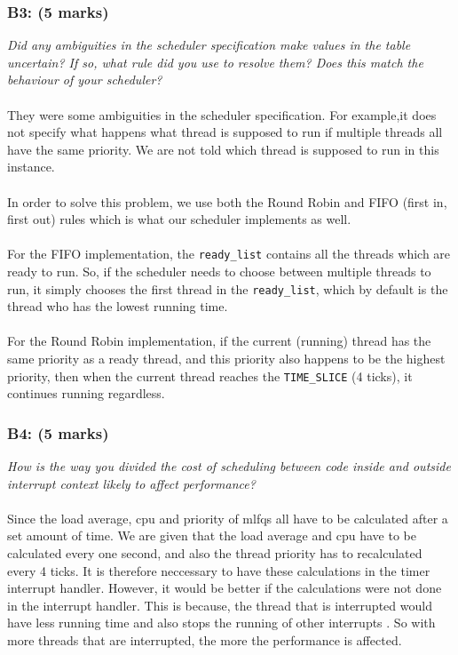 \documentclass{article}
\begin{document}
\subsubsection*{B3: (5 marks) }
\textit{Did any ambiguities in the scheduler specification make values in the table uncertain?  If so, what rule did you use to resolve them?  Does this match the behaviour of your scheduler?}
\\ \\
They were some ambiguities in the scheduler specification. For example,it does not specify what happens what thread is supposed to run if multiple threads all have the same priority. We are not told which thread is supposed to run in this instance.
  \\\\
In order to solve this problem, we use both the Round Robin and FIFO (first in, first out) rules which is what our scheduler implements as well.
  \\\\
For the FIFO implementation, the \texttt{ready\_list} contains all the threads which are ready to run. So, if the scheduler needs to choose between multiple threads to run, it simply chooses the first thread in the \texttt{ready\_list}, which by default is the thread who has the lowest running time.
  \\\\
For the Round Robin implementation, if the current (running) thread has the same priority as a ready thread, and this priority also happens to be the highest priority, then when the current thread reaches the \texttt{TIME\_SLICE} (4 ticks), it continues running regardless.

\subsubsection*{B4: (5 marks) }
\textit{How is the way you divided the cost of scheduling between code inside and outside interrupt context likely to affect performance?}
\\ \\
Since the load average, cpu and priority of mlfqs all have to be calculated after a set amount of time. We are given that the load average and cpu have to be calculated every one second, and also the thread priority has to recalculated every 4 ticks. It is therefore neccessary to have these calculations in the timer interrupt handler. However, it would be better if the calculations were not done in the interrupt handler. This is because, the thread that is interrupted would have less running time and also stops the running of other interrupts . So with more threads that are interrupted, the more the performance is affected.
\end{document}
